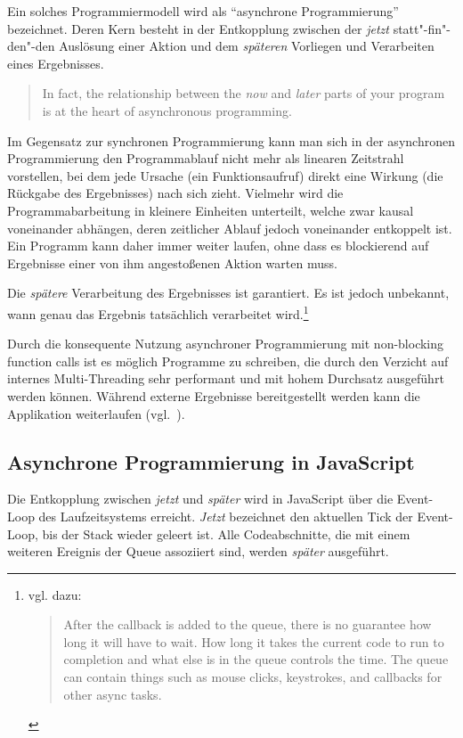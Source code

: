 \documentclass[
11pt, %
a4paper, %
oneside, %
pdfspacing, %
headinclude,
BCOR5mm, %
ngerman, %
bibtotocnumbered,
]{scrartcl}
\begin{document}
	Ein solches Programmiermodell wird als "`asynchrone Programmierung"' bezeichnet.
	Deren Kern besteht in der Entkopplung zwischen der \textit{jetzt} statt"-fin"-den"-den Auslösung einer Aktion und dem \textit{späteren} Vorliegen und Verarbeiten eines Ergebnisses.
	
	\begin{quote}In fact, the relationship between the \textit{now }and \textit{later }parts of your program is at the heart of asynchronous programming.~\citep{Simpson.2015}\end{quote}
	
	Im Gegensatz zur synchronen Programmierung kann man sich in der asynchronen Programmierung den Programmablauf nicht mehr als linearen Zeitstrahl vorstellen, bei dem jede Ursache (ein Funktionsaufruf) direkt eine Wirkung (die Rückgabe des Ergebnisses) nach sich zieht. Vielmehr wird die Programmabarbeitung in kleinere Einheiten unterteilt, welche zwar kausal voneinander abhängen, deren zeitlicher Ablauf jedoch voneinander entkoppelt ist. Ein Programm kann daher immer weiter laufen, ohne dass es blockierend auf Ergebnisse einer von ihm angestoßenen Aktion warten muss.
	
	Die \textit{spätere} Verarbeitung des Ergebnisses ist garantiert. Es ist jedoch unbekannt, wann genau das Ergebnis tatsächlich verarbeitet wird.\footnote{vgl. dazu: \begin{quote}After the callback is added to the queue, there is no guarantee how long it will have to wait. How long it takes the current code to run to completion and what else is in the queue controls the time. The queue can contain things such as mouse clicks, keystrokes, and callbacks for other async tasks.~\citep[S.~7]{Parker.2015}\end{quote}}
	
	Durch die konsequente Nutzung asynchroner Programmierung mit non-blocking function calls ist es möglich Programme zu schreiben, die durch den Verzicht auf internes Multi-Threading sehr performant und mit hohem Durchsatz ausgeführt werden können. Während externe Ergebnisse bereitgestellt werden kann die Applikation weiterlaufen (vgl.~\citep{Dahl.2009}). 
	
	
	\subsection{Asynchrone Programmierung in JavaScript}
	
	Die Entkopplung zwischen \emph{jetzt} und \emph{später} wird in JavaScript über die Event-Loop des Laufzeitsystems erreicht. \emph{Jetzt} bezeichnet den aktuellen Tick der Event-Loop, bis der Stack wieder geleert ist. Alle Code\-ab\-schnitte, die mit einem weiteren Ereignis der Queue assoziiert sind, werden \emph{später} ausgeführt.
	
\end{document}
